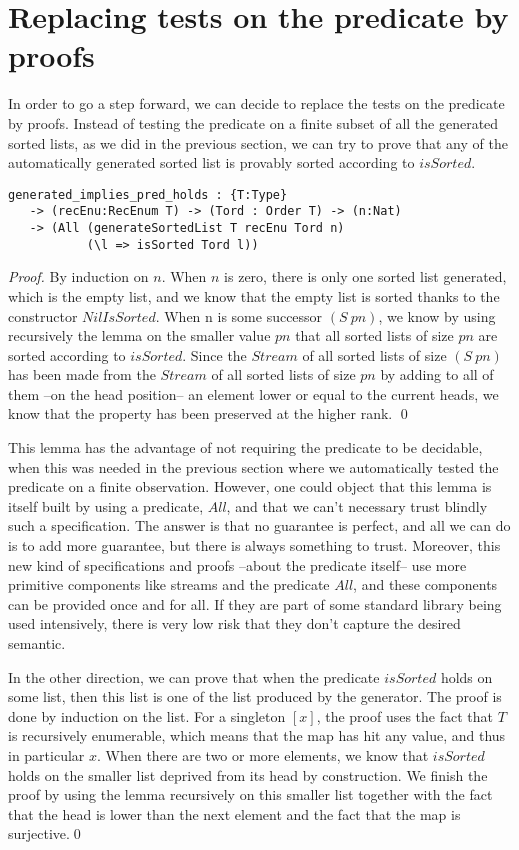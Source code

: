\section{Replacing tests on the predicate by proofs}

\label{sect:aStepForward}

In order to go a step forward, we can decide to replace the tests on the predicate by proofs. Instead of testing the predicate on a finite subset of all the generated sorted lists, as we did in the previous section, we can try to prove that any of the automatically generated sorted list is provably sorted according to $isSorted$.

\begin{lstlisting}
generated_implies_pred_holds : {T:Type} 
   -> (recEnu:RecEnum T) -> (Tord : Order T) -> (n:Nat) 
   -> (All (generateSortedList T recEnu Tord n) 
           (\l => isSorted Tord l))
\end{lstlisting}
\begin{proof}
By induction on $n$.
When $n$ is zero, there is only one sorted list generated, which is the empty list, and we know that the empty list is sorted thanks to the constructor $NilIsSorted$. When n is some successor $(S\ pn)$, we know by using recursively the lemma on the smaller value $pn$ that all sorted lists of size $pn$ are sorted according to $isSorted$. Since the $Stream$ of all sorted lists of size $(S\ pn)$ has been made from the $Stream$ of all sorted lists of size $pn$ by adding to all of them --on the head position-- an element lower or equal to the current heads, we know that the property has been preserved at the higher rank.
\qed
\end{proof}

This lemma has the advantage of not requiring the predicate to be decidable, when this was needed in the previous section where we automatically tested the predicate on a finite observation. However, one could object that this lemma is itself built by using a predicate, $All$, and that we can't necessary trust blindly such a specification. The answer is that no guarantee is perfect, and all we can do is to add more guarantee, but there is always something to trust. Moreover, this new kind of specifications and proofs --about the predicate itself-- use more primitive components like streams and the predicate $All$, and these components can be provided once and for all. If they are part of some standard library being used intensively, there is very low risk that they don't capture the desired semantic.

In the other direction, we can prove that when the predicate $isSorted$ holds on some list, then this list is one of the list produced by the generator. The proof is done by induction on the list. For a singleton $[x]$, the proof uses the fact that $T$ is recursively enumerable, which means that the map has hit any value, and thus in particular $x$. When there are two or more elements, we know that $isSorted$ holds on the smaller list deprived from its head by construction. We finish the proof by using the lemma recursively on this smaller list together with the fact that the head is lower than the next element and the fact that the map is surjective.\qed
